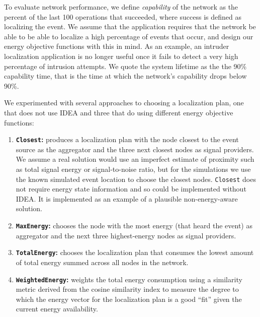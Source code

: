 To evaluate network performance, we define \textit{capability} of the network
as the percent of the last 100 operations that succeeded, where success is
defined as localizing the event. We assume that the application requires that
the network be able to be able to localize a high percentage of events that
occur, and design our energy objective functions with this in mind. As an
example, an intruder localization application is no longer useful once it
fails to detect a very high percentage of intrusion attempts. We quote the
system lifetime as the the 90\% capability time, that is the time at which
the network's capability drops below 90\%.

We experimented with several approaches to choosing a localization plan, one
that does not use IDEA and three that do using different energy objective
functions:

\begin{enumerate}

\item \textbf{\texttt{Closest}:} produces a localization plan with the node
closest to the event source as the aggregator and the three next closest
nodes as signal providers. We assume a real solution would use an imperfect
estimate of proximity such as total signal energy or signal-to-noise ratio,
but for the simulations we use the known simulated event location to choose
the closest nodes. \texttt{Closest} does not require energy state information
and so could be implemented without IDEA. It is implemented as an example of
a plausible non-energy-aware solution.

\item \textbf{\texttt{MaxEnergy}:} chooses the node with the most energy
(that heard the event) as aggregator and the next three highest-energy nodes
as signal providers.

\item \textbf{\texttt{TotalEnergy}:} chooses the localization plan that
consumes the lowest amount of total energy summed across all nodes in the
network.

\item \textbf{\texttt{WeightedEnergy}:} weights the total energy consumption
using a similarity metric derived from the cosine similarity index to measure
the degree to which the energy vector for the localization plan is a good
``fit'' given the current energy availability.

\end{enumerate}

